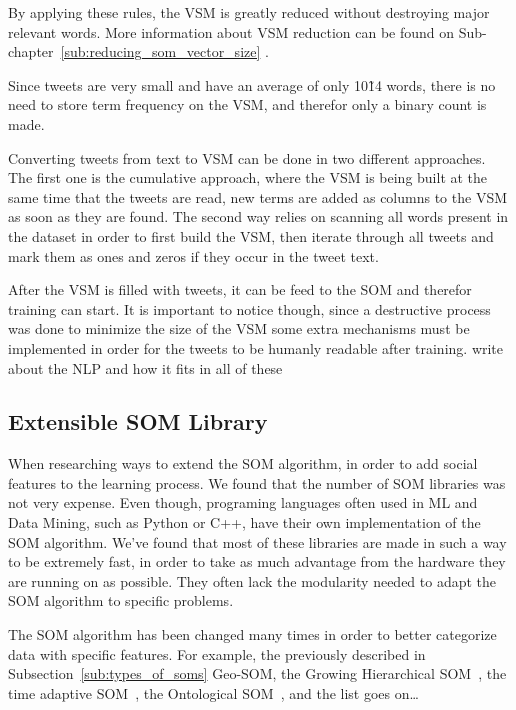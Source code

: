 By applying these rules, the \ac{VSM} is greatly reduced without destroying major relevant words. More information about \ac{VSM} reduction can be found on Sub-chapter~\ref{sub:reducing_som_vector_size} .

Since tweets are very small and have an average of only 10\~14 words, there is no need to store term frequency on the \ac{VSM}, and therefor only a binary count is made.

Converting tweets from text to \ac{VSM} can be done in two different approaches. The first one is the cumulative approach, where the \ac{VSM} is being built at the same time that the tweets are read, new terms are added as columns to the \ac{VSM} as soon as they are found. The second way relies on scanning all words present in the dataset in order to first build the \ac{VSM}, then iterate through all tweets and mark them as ones and zeros if they occur in the tweet text. 

After the \ac{VSM} is filled with tweets, it can be feed to the \ac{SOM} and therefor training can start. It is important to notice though, since a destructive process was done to minimize the size of the \ac{VSM} some extra mechanisms must be implemented in order for the tweets to be humanly readable after training.
{\color{red} write about the NLP and how it fits in all of these }
\subsection{Extensible SOM Library}
\label{sub:extensible_som_library}

When researching ways to extend the \ac{SOM} algorithm, in order to add social features to the learning process. We found that the number of \ac{SOM} libraries was not very expense. Even though, programing languages often used in \ac{ML} and Data Mining, such as Python or C++, have their own implementation of the \ac{SOM} algorithm. We've found that most of these libraries are made in such a way to be extremely fast, in order to take as much advantage from the hardware they are running on as possible. They often lack the modularity needed to adapt the \ac{SOM} algorithm to specific problems.

The \ac{SOM} algorithm has been changed many times in order to better categorize data with specific features. For example, the previously described in Subsection~\ref{sub:types_of_soms} Geo-\ac{SOM}, the Growing Hierarchical \ac{SOM}~\cite[]{1058070}, the time adaptive \ac{SOM}~\cite[]{1187438}, the Ontological \ac{SOM}~\cite[]{5446427}, and the list goes on\dots  

